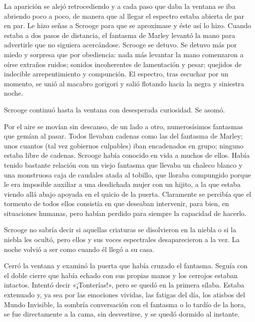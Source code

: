 \documentclass{novela}
\begin{document}
 La aparición se alejó retrocediendo y a cada paso que daba la ventana se iba abriendo poco a poco, de manera que al llegar el espectro estaba abierta de par en par. Le hizo señas a Scrooge para que se aproximase y éste así lo hizo. Cuando estaba a dos pasos de distancia, el fantasma de Marley levantó la mano para advertirle que no siguiera acercándose. Scrooge se detuvo. Se detuvo más por miedo y sorpresa que por obediencia: nada más levantar la mano comenzaron a oírse extraños ruidos; sonidos incoherentes de lamentación y pesar; quejidos de indecible arrepentimiento y compunción. El espectro, tras escuchar por un momento, se unió al macabro gorigori y salió flotando hacia la negra y siniestra noche.

 Scrooge continuó hasta la ventana con desesperada curiosidad. Se asomó.

 Por el aire se movían sin descanso, de un lado a otro, numerosísimos fantasmas que gemían al pasar. Todos llevaban cadenas como las del fantasma de Marley; unos cuantos (tal vez gobiernos culpables) iban encadenados en grupo; ninguno estaba libre de cadenas. Scrooge había conocido en vida a muchos de ellos. Había tenido bastante relación con un viejo fantasma que llevaba un chaleco blanco y una monstruosa caja de caudales atada al tobillo, que lloraba compungido porque le era imposible auxiliar a una desdichada mujer con un hijito, a la que estaba viendo allá abajo apoyada en el quicio de la puerta. Claramente se percibía que el tormento de todos ellos consistía en que deseaban intervenir, para bien, en situaciones humanas, pero habían perdido para siempre la capacidad de hacerlo.

 Scrooge no sabría decir si aquellas criaturas se disolvieron en la niebla o si la niebla les ocultó, pero ellos y sus voces espectrales desaparecieron a la vez. La noche volvió a ser como cuando él llegó a su casa.

 Cerró la ventana y examinó la puerta que había cruzado el fantasma. Seguía con el doble cierre que había echado con sus propias manos y los cerrojos estaban intactos. Intentó decir «¡Tonterías!», pero se quedó en la primera sílaba. Estaba extenuado y, ya sea por las emociones vividas, las fatigas del día, los atisbos del Mundo Invisible, la sombría conversación con el fantasma o lo tardío de la hora, se fue directamente a la cama, sin desvestirse, y se quedó dormido al instante.





\end{document}
